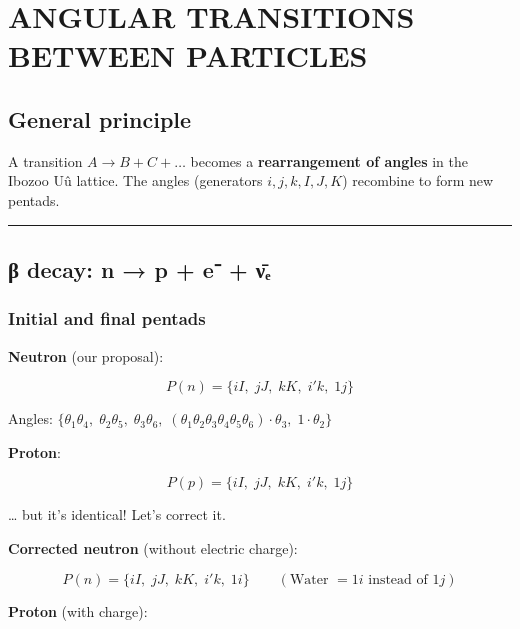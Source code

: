 \documentclass[11pt]{article}
\begin{document}
\clearpage
{}

\hypertarget{angular-transitions-between-particles}{%
\section{ANGULAR TRANSITIONS BETWEEN
PARTICLES}\label{angular-transitions-between-particles}}

\hypertarget{general-principle}{%
\subsection{General principle}\label{general-principle}}

A transition \(A \to B + C + \dots\) becomes a \textbf{rearrangement of
angles} in the Ibozoo Uû lattice. The angles (generators
\(i,j,k,I,J,K\)) recombine to form new pentads.

\begin{center}\rule{0.5\linewidth}{0.5pt}\end{center}

\hypertarget{ux3b2-decay-n-p-e-ux3bdux2091}{%
\subsection{β decay: n → p + e⁻ +
ν̄ₑ}\label{ux3b2-decay-n-p-e-ux3bdux2091}}

\hypertarget{initial-and-final-pentads}{%
\subsubsection{Initial and final
pentads}\label{initial-and-final-pentads}}

\textbf{Neutron} (our proposal):

\[P(n) = \{ iI,\; jJ,\; kK,\; i'k,\; 1j \}\]

Angles:
\(\{\theta_1\theta_4,\; \theta_2\theta_5,\; \theta_3\theta_6,\; (\theta_1\theta_2\theta_3\theta_4\theta_5\theta_6)\cdot\theta_3,\; 1\cdot\theta_2\}\)

\textbf{Proton}:

\[P(p) = \{ iI,\; jJ,\; kK,\; i'k,\; 1j \}\]

\ldots{} but it's identical! Let's correct it.

\textbf{Corrected neutron} (without electric charge):

\[P(n) = \{ iI,\; jJ,\; kK,\; i'k,\; 1i \} \qquad (\text{Water } = 1i \text{ instead of } 1j)\]

\textbf{Proton} (with charge):
\end{document}
